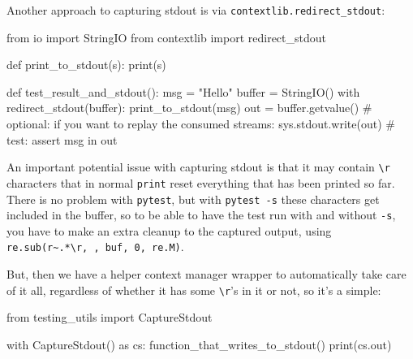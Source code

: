 \documentclass[
]{report}
\newenvironment{Shaded}{\begin{snugshade}}{\end{snugshade}}
\newcommand{\BuiltInTok}[1]{\textcolor[rgb]{0.00,0.23,0.31}{#1}}
\newcommand{\CommentTok}[1]{\textcolor[rgb]{0.37,0.37,0.37}{#1}}
\newcommand{\ControlFlowTok}[1]{\textcolor[rgb]{0.00,0.23,0.31}{#1}}
\newcommand{\ImportTok}[1]{\textcolor[rgb]{0.00,0.46,0.62}{#1}}
\newcommand{\KeywordTok}[1]{\textcolor[rgb]{0.00,0.23,0.31}{#1}}
\newcommand{\NormalTok}[1]{\textcolor[rgb]{0.00,0.23,0.31}{#1}}
\newcommand{\OperatorTok}[1]{\textcolor[rgb]{0.37,0.37,0.37}{#1}}
\newcommand{\StringTok}[1]{\textcolor[rgb]{0.13,0.47,0.30}{#1}}
\begin{document}
Another approach to capturing stdout is via
\texttt{contextlib.redirect\_stdout}:

\begin{Shaded}
\begin{Highlighting}[]
\ImportTok{from}\NormalTok{ io }\ImportTok{import}\NormalTok{ StringIO}
\ImportTok{from}\NormalTok{ contextlib }\ImportTok{import}\NormalTok{ redirect\_stdout}


\KeywordTok{def}\NormalTok{ print\_to\_stdout(s):}
    \BuiltInTok{print}\NormalTok{(s)}


\KeywordTok{def}\NormalTok{ test\_result\_and\_stdout():}
\NormalTok{    msg }\OperatorTok{=} \StringTok{"Hello"}
    \BuiltInTok{buffer} \OperatorTok{=}\NormalTok{ StringIO()}
    \ControlFlowTok{with}\NormalTok{ redirect\_stdout(}\BuiltInTok{buffer}\NormalTok{):}
\NormalTok{        print\_to\_stdout(msg)}
\NormalTok{    out }\OperatorTok{=} \BuiltInTok{buffer}\NormalTok{.getvalue()}
    \CommentTok{\# optional: if you want to replay the consumed streams:}
\NormalTok{    sys.stdout.write(out)}
    \CommentTok{\# test:}
    \ControlFlowTok{assert}\NormalTok{ msg }\KeywordTok{in}\NormalTok{ out}
\end{Highlighting}
\end{Shaded}

An important potential issue with capturing stdout is that it may
contain \texttt{\textbackslash{}r} characters that in normal
\texttt{print} reset everything that has been printed so far. There is
no problem with \texttt{pytest}, but with \texttt{pytest\ -s} these
characters get included in the buffer, so to be able to have the test
run with and without \texttt{-s}, you have to make an extra cleanup to
the captured output, using
\texttt{re.sub(r\textquotesingle{}\textasciitilde{}.*\textbackslash{}r\textquotesingle{},\ \textquotesingle{}\textquotesingle{},\ buf,\ 0,\ re.M)}.

But, then we have a helper context manager wrapper to automatically take
care of it all, regardless of whether it has some
\texttt{\textbackslash{}r}'s in it or not, so it's a simple:

\begin{Shaded}
\begin{Highlighting}[]
\ImportTok{from}\NormalTok{ testing\_utils }\ImportTok{import}\NormalTok{ CaptureStdout}

\ControlFlowTok{with}\NormalTok{ CaptureStdout() }\ImportTok{as}\NormalTok{ cs:}
\NormalTok{    function\_that\_writes\_to\_stdout()}
\BuiltInTok{print}\NormalTok{(cs.out)}
\end{Highlighting}
\end{Shaded}
\end{document}
